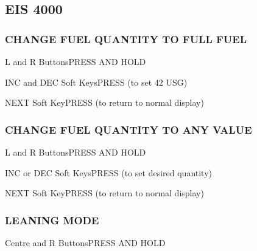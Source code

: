 \changepage{\checklistTextHeight}{\checklistTextWidth}{\checklistEvenSideMargin}{\checklistOddSideMargin}{}{\checklistTopMargin}{0pt}{0pt}{0pt}%


\begin{multicols}{2}
\raggedcolumns

\subsection*{EIS 4000}
\subsubsection*{CHANGE FUEL QUANTITY TO FULL FUEL}
\begin{enumerate*}
\item L and R Buttons\dotfill PRESS AND HOLD
\item INC and DEC Soft Keys\dotfill PRESS (to set 42 USG)
\item NEXT Soft Key\dotfill PRESS (to return to normal display)
\end{enumerate*}

\subsubsection*{CHANGE FUEL QUANTITY TO ANY VALUE}
\begin{enumerate*}
\item L and R Buttons\dotfill PRESS AND HOLD
\item INC or DEC Soft Keys\dotfill PRESS (to set desired quantity)
\item NEXT Soft Key\dotfill PRESS (to return to normal display)
\end{enumerate*}

\subsubsection*{LEANING MODE}
\begin{enumerate*}
\item Centre and R Buttons\dotfill PRESS AND HOLD
\end{enumerate*}



\end{multicols}
